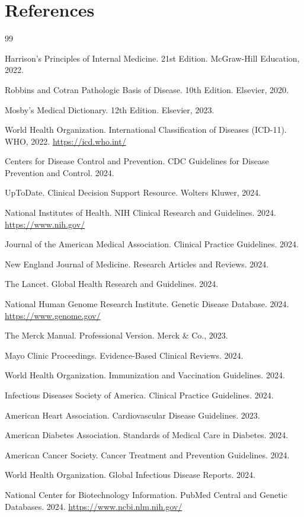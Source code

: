 \chapter*{References}

\begin{thebibliography}{99}

Harrison's Principles of Internal Medicine.
21st Edition. McGraw-Hill Education, 2022.

Robbins and Cotran Pathologic Basis of Disease.
10th Edition. Elsevier, 2020.

Mosby's Medical Dictionary.
12th Edition. Elsevier, 2023.

World Health Organization. International Classification of Diseases (ICD-11).
WHO, 2022. \url{https://icd.who.int/}

Centers for Disease Control and Prevention.
CDC Guidelines for Disease Prevention and Control. 2024.

UpToDate. Clinical Decision Support Resource.
Wolters Kluwer, 2024.

National Institutes of Health.
NIH Clinical Research and Guidelines. 2024. \url{https://www.nih.gov/}

Journal of the American Medical Association.
Clinical Practice Guidelines. 2024.

New England Journal of Medicine.
Research Articles and Reviews. 2024.

The Lancet.
Global Health Research and Guidelines. 2024.

National Human Genome Research Institute.
Genetic Disease Database. 2024. \url{https://www.genome.gov/}

The Merck Manual.
Professional Version. Merck \& Co., 2023.

Mayo Clinic Proceedings.
Evidence-Based Clinical Reviews. 2024.

World Health Organization.
Immunization and Vaccination Guidelines. 2024.

Infectious Diseases Society of America.
Clinical Practice Guidelines. 2024.

American Heart Association.
Cardiovascular Disease Guidelines. 2023.

American Diabetes Association.
Standards of Medical Care in Diabetes. 2024.

American Cancer Society.
Cancer Treatment and Prevention Guidelines. 2024.

World Health Organization.
Global Infectious Disease Reports. 2024.

National Center for Biotechnology Information.
PubMed Central and Genetic Databases. 2024. \url{https://www.ncbi.nlm.nih.gov/}

\end{thebibliography}

\clearpage
